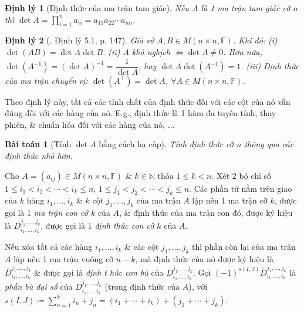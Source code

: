 \documentclass{article}
\newtheorem{baitoan}{Bài toán}
\newtheorem{dinhly}{Định lý}
\begin{document}
\begin{dinhly}[Định thức của ma trận tam giác]
	Nếu $A$ là 1 ma trận tam giác cỡ $n$ thì $\det A = \prod_{i=1}^n a_{ii} = a_{11}a_{22}\cdots a_{nn}$.
\end{dinhly}

\begin{dinhly}[\cite{Hung_linear_algebra}, Định lý 5.1, p. 147]
	Giả sử $A,B\in M(n\times n,\mathbb{F})$. Khi đó: (i) $\det(AB) = \det A\det B$. (ii) $A$ khả nghịch $\Leftrightarrow\det A\ne0$. Hơn nữa, $\det(A^{-1}) = (\det A)^{-1} = \dfrac{1}{\det A}$, hay $\det A\det(A^{-1}) = 1$. (iii) Định thức của ma trận chuyển vị: $\det(A^\top) = \det A$, $\forall A\in M(n\times n,\mathbb{F})$.
\end{dinhly}
Theo định lý này, tất cả các tính chất của định thức đối với các cột của nó vẫn đúng đối với các hàng của nó. E.g., định thức là 1 hàm đa tuyến tính, thay phiên, \& chuẩn hóa đối với các hàng của nó, $\ldots$

\begin{baitoan}[Tính $\det A$ bằng cách hạ cấp]
	Tính định thức cỡ $n$ thông qua các định thức nhỏ hơn.
\end{baitoan}
Cho $A = (a_{ij})\in M(n\times n,\mathbb{F})$ \& $k\in\mathbb{N}$ thỏa $1\le k < n$. Xét 2 bộ chỉ số $1\le i_1 < i_2 < \cdots < i_k\le n$, $1\le j_1 < j_2 < \cdots < j_k\le n$. Các phần tử nằm trên giao của $k$ hàng $i_1,\ldots,i_k$ \& $k$ cột $j_1,\ldots,j_k$ của ma trận $A$ lập nên 1 ma trận cỡ $k$, được gọi là 1 {\it ma trận con cỡ $k$} của $A$, \& định thức của ma trận con đó, được ký hiệu là $D_{i_1,\ldots,i_k}^{j_1,\ldots,j_k}$, được gọi là 1 {\it định thức con cỡ $k$} của $A$.

Nếu xóa tất cả các hàng $i_1,\ldots,i_k$ \& các cột $j_1,\ldots,j_k$ thì phần còn lại của ma trận $A$ lập nên 1 ma trận vuông cỡ $n - k$, mà định thức của nó được ký hiệu là $\overline{D}_{i_1,\ldots,i_k}^{j_1,\ldots,j_k}$ \& được gọi là {\it định t hức con bù} của $D_{i_1,\ldots,i_k}^{j_1,\ldots,j_k}$. Gọi $(-1)^{s(I,J)}\overline{D}_{i_1,\ldots,i_k}^{j_1,\ldots,j_k}$ là {\it phần bù đại số} của $D_{i_1,\ldots,i_k}^{j_1,\ldots,j_k}$ (trong định thức của $A$), với $s(I,J)\coloneqq\sum_{n=1}^k i_n + j_n = (i_1 + \cdots + i_k) + (j_1 + \cdots + j_k)$.
\end{document}

